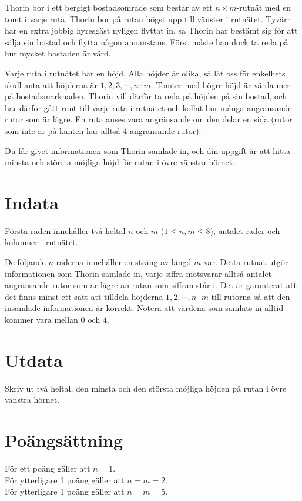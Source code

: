 

\noindent
Thorin bor i ett bergigt bostadsområde som består av ett $n \times m$-rutnät med en tomt i varje ruta.
Thorin bor på rutan högst upp till vänster i rutnätet.
Tyvärr har en extra jobbig hyresgäst nyligen flyttat in, så Thorin har bestämt sig för att sälja sin bostad och flytta någon annanstans.
Först måste han dock ta reda på hur mycket bostaden är värd.

Varje ruta i rutnätet har en höjd. Alla höjder är olika, så låt oss för enkelhets skull anta att höjderna är $1, 2, 3, \cdots, n\cdot m$.
Tomter med högre höjd är värda mer på bostadsmarknaden.
Thorin vill därför ta reda på höjden på sin bostad, och har därför gått runt till varje ruta i rutnätet och kollat hur många angränsande rutor som är lägre.
En ruta anses vara angränsande om den delar en sida (rutor som inte är på kanten har alltså $4$ angränsande rutor).

Du får givet informationen som Thorin samlade in, och din uppgift är att hitta minsta och största möjliga höjd för rutan i övre vänstra hörnet.

\section*{Indata}
Första raden innehåller två heltal $n$ och $m$ ($1 \leq n,m \leq 8$), antalet rader och kolumner i
rutnätet.

De följande $n$ raderna innehåller en sträng av längd $m$ var. Detta rutnät utgör informationen
som Thorin samlade in, varje siffra motsvarar alltså antalet angränsande rutor som är lägre än rutan som
siffran står i. Det är garanterat att det finns minst ett sätt att tilldela höjderna 
$1, 2, \cdots, n\cdot m$ till rutorna så att den insamlade informationen är korrekt. Notera att värdena
som samlats in alltid kommer vara mellan $0$ och $4$.

\section*{Utdata}
Skriv ut två heltal, den minsta och den största möjliga höjden på rutan i övre vänstra hörnet.

\section*{Poängsättning}
För ett poäng gäller att $n = 1$.\\
För ytterligare 1 poäng gäller att $n = m = 2$.\\
För ytterligare 1 poäng gäller att $n = m = 5$.\\

